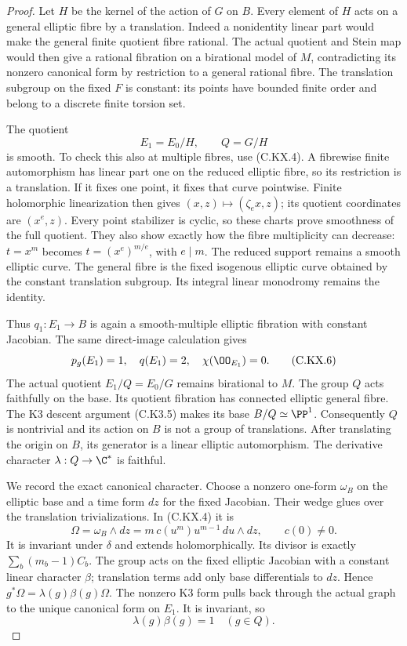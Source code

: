 \begin{proof}
Let $H$ be the kernel of the
action of $G$ on $B$.
Every element of $H$ acts
on a general elliptic fibre
by a translation. Indeed
a nonidentity linear part
would make the general
finite quotient fibre
rational. The actual
quotient and Stein map
would then give a rational
fibration on a birational
model of $M$, contradicting
its nonzero canonical form
by restriction to a general
rational fibre.
The translation subgroup
on the fixed $F$ is
constant: its points have
bounded finite order and
belong to a discrete
finite torsion set.

The quotient
\[
              E_1=E_0/H,\qquad Q=G/H
                                                               \tag{C.KX.5}
\]
is smooth. To check this
also at multiple fibres,
use (C.KX.4). A fibrewise
finite automorphism has
linear part one on the
reduced elliptic fibre,
so its restriction is
a translation. If it
fixes one point, it
fixes that curve pointwise.
Finite holomorphic
linearization then gives
$(x,z)\mapsto(\zeta_e x,z)$;
its quotient coordinates
are $(x^e,z)$. Every
point stabilizer is
cyclic, so these charts
prove smoothness of the
full quotient. They also
show exactly how the
fibre multiplicity can
decrease: $t=x^m$ becomes
$t=(x^e)^{m/e}$, with
$e\mid m$. The reduced
support remains a smooth
elliptic curve. The
general fibre is the
fixed isogenous elliptic
curve obtained by the
constant translation
subgroup. Its integral
linear monodromy remains
the identity.

Thus $q_1:E_1\to B$ is
again a smooth-multiple
elliptic fibration with
constant Jacobian.
The same direct-image
calculation gives
\[
 p_g(E_1)=1,\quad q(E_1)=2,\quad
                 \chi(\OO_{E_1})=0 .
                                                               \tag{C.KX.6}
\]
The actual quotient
$E_1/Q=E_0/G$ remains
birational to $M$.
The group $Q$ acts
faithfully on the base.
Its quotient fibration
has connected elliptic
general fibre. The
K3 descent argument
(C.K3.5) makes its
base $B/Q\simeq\PP^1$.
Consequently $Q$ is
nontrivial and its
action on $B$ is not
a group of translations.
After translating the
origin on $B$, its
generator is a linear
elliptic automorphism.
The derivative character
$\lambda:Q\to\C^*$ is
faithful.

We record the exact
canonical character.
Choose a nonzero
one-form $\omega_B$
on the elliptic base
and a time form $dz$
for the fixed Jacobian.
Their wedge glues
over the translation
trivializations. In
(C.KX.4) it is
\[
 \Omega=\omega_B\wedge dz
        =m\,c(u^m)u^{m-1}\,du\wedge dz ,
                  \qquad c(0)\ne0 .
                                                               \tag{C.KX.7}
\]
It is invariant under
$\delta$ and extends
holomorphically. Its
divisor is exactly
$\sum_b(m_b-1)C_b$.
The group acts on
the fixed elliptic
Jacobian with a
constant linear
character $\beta$;
translation terms
add only base
differentials to $dz$.
Hence
$g^*\Omega=\lambda(g)\beta(g)\Omega$.
The nonzero K3 form
pulls back through
the actual graph to
the unique canonical
form on $E_1$.
It is invariant, so
\[
                   \lambda(g)\beta(g)=1
                       \quad(g\in Q).                \tag{C.KX.8}
\]


\end{proof}
